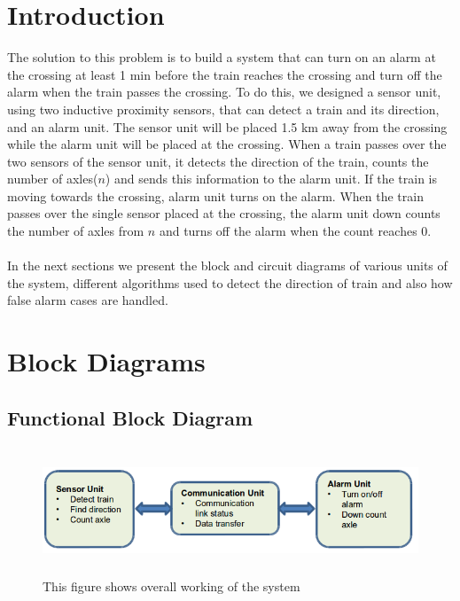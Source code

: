 \documentclass[aps,letterpaper,11pt]{article}
\begin{document}
\section{Introduction}
The solution to this problem is to build a system that can turn on an alarm at the crossing at least 1 min
before the train reaches the crossing and turn off the alarm when the train passes the crossing. To do this, we
designed a sensor unit, using two inductive proximity sensors, that can detect a train and its direction,
and an alarm unit. The sensor unit will be placed 1.5 km away from the crossing while the alarm unit will be
placed at the crossing. When a train passes over the two sensors of the sensor unit, it detects the direction
of the train, counts the number of axles\footnotemark{}($n$) and sends this information to the alarm unit. If the train is moving
towards the crossing, alarm unit turns on the alarm. When the train passes over the single sensor placed at the crossing,
the alarm unit down counts the number of axles from $n$ and turns off the alarm when the count reaches 0.
\\ \\
In the next sections we present the block and circuit diagrams of various units of the system, different
algorithms used to detect the direction of train and also how false alarm cases are handled.

\section{Block Diagrams}
\subsection{Functional Block Diagram}

\begin{figure}[H]
\begin{center}
\includegraphics[height = 1.5in,width=5.5in,angle=00]{figures/block1.png}
\caption{\small This figure shows overall working of the system}
\end{center}
\end{figure}
\end{document}
